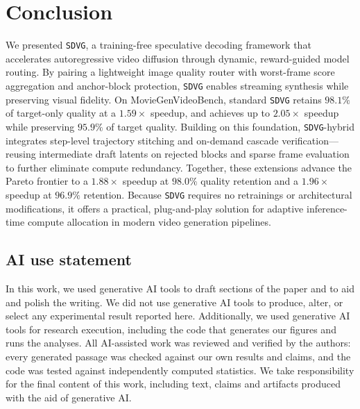 \documentclass{article} %
\begin{document}
\section{Conclusion}

We presented \texttt{SDVG}, a training-free speculative decoding framework that accelerates autoregressive video diffusion through dynamic, reward-guided model routing. By pairing a lightweight image quality router with worst-frame score aggregation and anchor-block protection, \texttt{SDVG} enables streaming synthesis while preserving visual fidelity. On MovieGenVideoBench, standard \texttt{SDVG} retains $98.1\%$ of target-only quality at a $1.59\times$ speedup, and achieves up to $2.05\times$ speedup while preserving $95.9\%$ of target quality. Building on this foundation, \texttt{SDVG}-hybrid integrates step-level trajectory stitching and on-demand cascade verification—reusing intermediate draft latents on rejected blocks and sparse frame evaluation to further eliminate compute redundancy. Together, these extensions advance the Pareto frontier to a $1.88\times$ speedup at $98.0\%$ quality retention and a $1.96\times$ speedup at $96.9\%$ retention. Because \texttt{SDVG} requires no retrainings or architectural modifications, it offers a practical, plug-and-play solution for adaptive inference-time compute allocation in modern video generation pipelines.

\subsection*{AI use statement}

In this work, we used generative AI tools to draft sections of the paper and
to aid and polish the writing. We did not use generative AI tools to produce,
alter, or select any experimental result reported here. Additionally, we used
generative AI tools for research execution, including the code
that generates our figures and runs the analyses. All AI-assisted work was
reviewed and verified by the authors: every generated passage was checked
against our own results and claims, and the code was tested against
independently computed statistics. We take responsibility for the final
content of this work, including text, claims and artifacts produced with the
aid of generative AI.

\iffalse
\end{document}
